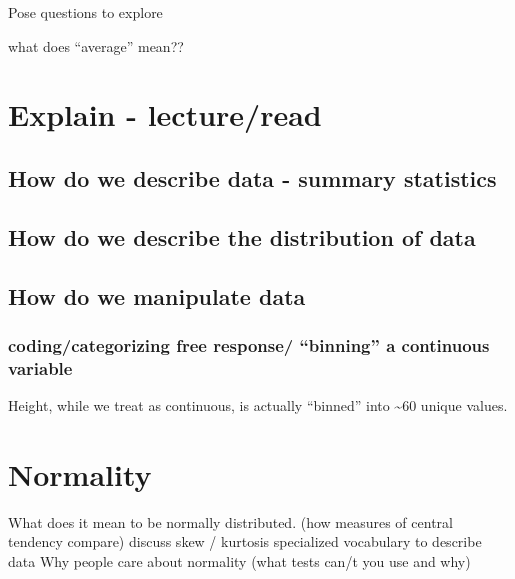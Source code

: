 \documentclass[
]{book}
\begin{document}
Pose questions to explore

what does ``average'' mean??

\hypertarget{explain---lectureread}{%
\section{Explain - lecture/read}\label{explain---lectureread}}

\hypertarget{how-do-we-describe-data---summary-statistics}{%
\subsection{How do we describe data - summary statistics}\label{how-do-we-describe-data---summary-statistics}}

\hypertarget{how-do-we-describe-the-distribution-of-data}{%
\subsection{How do we describe the distribution of data}\label{how-do-we-describe-the-distribution-of-data}}

\hypertarget{how-do-we-manipulate-data}{%
\subsection{How do we manipulate data}\label{how-do-we-manipulate-data}}

\hypertarget{codingcategorizing-free-response-binning-a-continuous-variable}{%
\subsubsection{coding/categorizing free response/ ``binning'' a continuous variable}\label{codingcategorizing-free-response-binning-a-continuous-variable}}

Height, while we treat as continuous, is actually ``binned'' into \textasciitilde60 unique values.

\hypertarget{normality}{%
\section{Normality}\label{normality}}

What does it mean to be normally distributed. (how measures of central tendency compare)
discuss skew / kurtosis
specialized vocabulary to describe data
Why people care about normality (what tests can/t you use and why)
\end{document}
